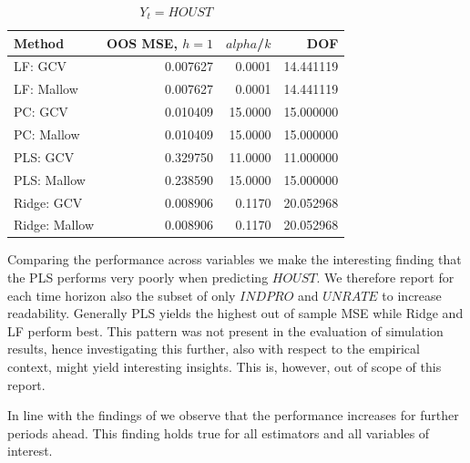 \begin{table}[h!]
\centering
\caption{$Y_t = HOUST$}
\label{tab::houst}
\begin{tabular}{lrrr}
\toprule
       Method &  OOS MSE, $h =1$ &  $alpha$/$k$ &  DOF \\
\midrule
      LF: GCV & 0.007627 &   0.0001 & 14.441119 \\
   LF: Mallow & 0.007627 &   0.0001 & 14.441119 \\
      PC: GCV & 0.010409 &  15.0000 & 15.000000 \\
   PC: Mallow & 0.010409 &  15.0000 & 15.000000 \\
     PLS: GCV & 0.329750 &  11.0000 & 11.000000 \\
  PLS: Mallow & 0.238590 &  15.0000 & 15.000000 \\
   Ridge: GCV & 0.008906 &   0.1170 & 20.052968 \\
Ridge: Mallow & 0.008906 &   0.1170 & 20.052968 \\
\bottomrule
\end{tabular}
\end{table}

Comparing the performance across variables we make the interesting finding that the PLS performs very poorly when predicting $HOUST$. We therefore report for each time horizon also the subset of only $INDPRO$ and $UNRATE$ to increase readability. Generally PLS yields the highest out of sample MSE while Ridge and LF perform best. This pattern was not present in the evaluation of simulation results, hence investigating this further, also with respect to the empirical context, might yield interesting insights. This is, however, out of scope of this report.

In line with the findings of \citeauthor{coulombe2020machine} we observe that the performance increases for further periods ahead. This finding holds true for all estimators and all variables of interest. 


